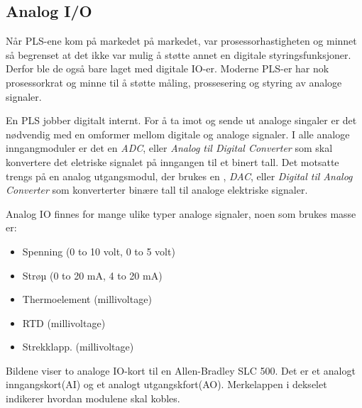 \filbreak
\subsection{Analog I/O}

Når PLS-ene kom på markedet på markedet, var prosessorhastigheten og minnet så begrenset at det ikke var mulig å støtte annet en digitale styringsfunksjoner. Derfor ble de også bare laget med digitale IO-er. Moderne PLS-er har nok prosessorkrat og minne til å støtte måling, prossesering og styring av analoge signaler. 

En PLS jobber digitalt internt. For å ta imot og sende ut analoge singaler er det nødvendig med en omformer mellom digitale og analoge signaler. I alle analoge inngangmoduler er det en \textit{ADC}, eller \textit{Analog til Digital Converter} som skal konvertere det eletriske signalet på inngangen til et binert tall. Det motsatte trengs på en analog utgangsmodul, der brukes  en , \textit{DAC}, eller \textit{Digital til Analog Converter} som konverterter binære tall til analoge elektriske signaler.        

Analog IO finnes for mange ulike typer analoge signaler, noen som brukes masse er:


\begin{itemize}
\item Spenning (0 to 10 volt, 0 to 5 volt)
\item Strøµ (0 to 20 mA, 4 to 20 mA)
\item Thermoelement (millivoltage)
\item RTD (millivoltage)
\item Strekklapp.  (millivoltage)
\end{itemize}

\filbreak

Bildene viser to analoge IO-kort til en Allen-Bradley SLC 500. Det er et analogt inngangskort(AI) og et analogt utgangskfort(AO).  Merkelappen i dekselet indikerer hvordan modulene skal kobles. 


